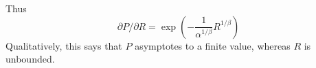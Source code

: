 \documentclass[11pt,letterpaper]{article}
\begin{document}
Thus
\begin{equation}\label{eq:derivatives}
	\partial P/\partial R = \exp\left(-\frac{1}{\alpha^{1/\beta}} R^{1/\beta}\right) %
\end{equation}
Qualitatively, this says that $P$ asymptotes to a finite value, whereas $R$ is unbounded.

%
%
%



%
%


%
%
%
%
%
\end{document}
